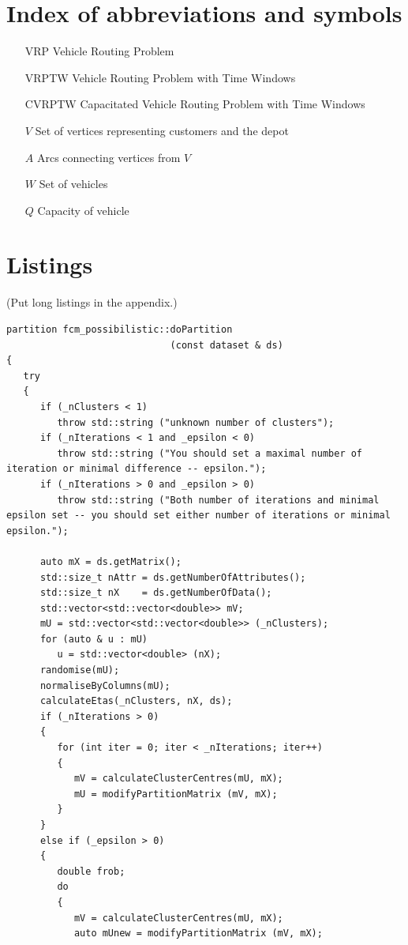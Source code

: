 \documentclass[a4paper,twoside,12pt]{book}
\begin{document}
\begin{appendices} 


 

\chapter*{Index of abbreviations and symbols}

\begin{itemize}
\item[VRP] Vehicle Routing Problem
\item[VRPTW] Vehicle Routing Problem with Time Windows
\item[CVRPTW] Capacitated Vehicle Routing Problem with Time Windows
\item[$V$] Set of vertices representing customers and the depot
\item[$A$] Arcs connecting vertices from $V$
\item[$W$] Set of vehicles
\item[$Q$] Capacity of vehicle
\end{itemize}


\chapter*{Listings}

(Put long listings in the appendix.)

\begin{lstlisting}
partition fcm_possibilistic::doPartition
                             (const dataset & ds)
{
   try
   {
      if (_nClusters < 1)
         throw std::string ("unknown number of clusters");
      if (_nIterations < 1 and _epsilon < 0)
         throw std::string ("You should set a maximal number of iteration or minimal difference -- epsilon.");
      if (_nIterations > 0 and _epsilon > 0)
         throw std::string ("Both number of iterations and minimal epsilon set -- you should set either number of iterations or minimal epsilon.");
   
      auto mX = ds.getMatrix();
      std::size_t nAttr = ds.getNumberOfAttributes();
      std::size_t nX    = ds.getNumberOfData();
      std::vector<std::vector<double>> mV;
      mU = std::vector<std::vector<double>> (_nClusters);
      for (auto & u : mU)
         u = std::vector<double> (nX);
      randomise(mU);
      normaliseByColumns(mU);
      calculateEtas(_nClusters, nX, ds);
      if (_nIterations > 0)
      {
         for (int iter = 0; iter < _nIterations; iter++)
         {
            mV = calculateClusterCentres(mU, mX);
            mU = modifyPartitionMatrix (mV, mX);
         }
      }
      else if (_epsilon > 0)
      {
         double frob;
         do 
         {
            mV = calculateClusterCentres(mU, mX);
            auto mUnew = modifyPartitionMatrix (mV, mX);
            

\end{lstlisting}
\end{appendices}
\end{document}
